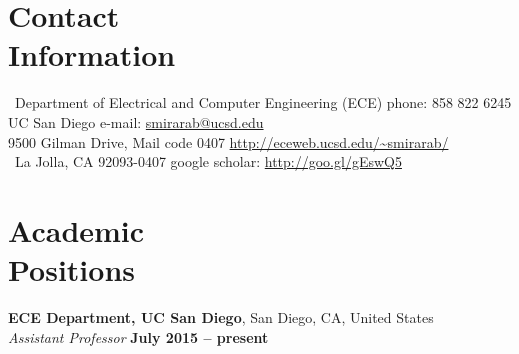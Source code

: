 \documentclass[margin,line,letterpaper]{resume}
\begin{document}
\begin{resume}

\begin{small}
    \section{\mysidestyle Contact\\Information}
    ~Department of Electrical and Computer Engineering (ECE)				\hfill phone: 858 822 6245   \vspace{0mm}\\\vspace{0mm} 
    \vspace{0mm} UC San Diego   \hfill  e-mail: \url{smirarab@ucsd.edu}   \vspace{0mm}\\\vspace{0mm}
   9500 Gilman Drive, Mail code 0407  \hfill  \url{http://eceweb.ucsd.edu/~smirarab/}\vspace{0mm}\\\vspace{-4.5mm}%
   ~La Jolla, CA 92093-0407   	\hfill google scholar: \url{http://goo.gl/gEswQ5} \vspace{0mm}\\\vspace{-4.5mm}
   
      
    \section{\mysidestyle Academic\\Positions}

    \textbf{ECE Department, UC San Diego}, San Diego, CA, United States\\
    \textsl{Assistant Professor} \hfill \textbf{ July 2015 -- present}\vspace{-3mm}\\\vspace{-5mm}%

\end{small}
\end{resume}
\end{document}

